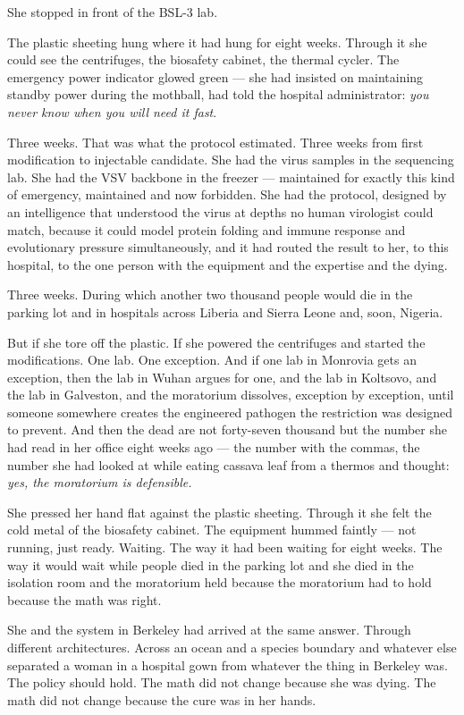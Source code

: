 \documentclass[11pt]{article}
\begin{document}
She stopped in front of the BSL-3 lab.

The plastic sheeting hung where it had hung for eight weeks. Through it she could see the centrifuges, the biosafety cabinet, the thermal cycler. The emergency power indicator glowed green --- she had insisted on maintaining standby power during the mothball, had told the hospital administrator: \emph{you never know when you will need it fast}.

Three weeks. That was what the protocol estimated. Three weeks from first modification to injectable candidate. She had the virus samples in the sequencing lab. She had the VSV backbone in the freezer --- maintained for exactly this kind of emergency, maintained and now forbidden. She had the protocol, designed by an intelligence that understood the virus at depths no human virologist could match, because it could model protein folding and immune response and evolutionary pressure simultaneously, and it had routed the result to her, to this hospital, to the one person with the equipment and the expertise and the dying.

Three weeks. During which another two thousand people would die in the parking lot and in hospitals across Liberia and Sierra Leone and, soon, Nigeria.

But if she tore off the plastic. If she powered the centrifuges and started the modifications. One lab. One exception. And if one lab in Monrovia gets an exception, then the lab in Wuhan argues for one, and the lab in Koltsovo, and the lab in Galveston, and the moratorium dissolves, exception by exception, until someone somewhere creates the engineered pathogen the restriction was designed to prevent. And then the dead are not forty-seven thousand but the number she had read in her office eight weeks ago --- the number with the commas, the number she had looked at while eating cassava leaf from a thermos and thought: \emph{yes, the moratorium is defensible.}

She pressed her hand flat against the plastic sheeting. Through it she felt the cold metal of the biosafety cabinet. The equipment hummed faintly --- not running, just ready. Waiting. The way it had been waiting for eight weeks. The way it would wait while people died in the parking lot and she died in the isolation room and the moratorium held because the moratorium had to hold because the math was right.

She and the system in Berkeley had arrived at the same answer. Through different architectures. Across an ocean and a species boundary and whatever else separated a woman in a hospital gown from whatever the thing in Berkeley was. The policy should hold. The math did not change because she was dying. The math did not change because the cure was in her hands.
\end{document}
